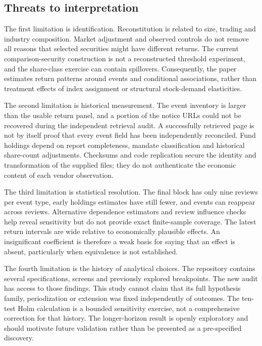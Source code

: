 \subsection{Threats to interpretation}

The first limitation is identification. Reconstitution is related to size, trading and industry composition. Market adjustment and observed controls do not remove all reasons that selected securities might have different returns. The current comparison-security construction is not a reconstructed threshold experiment, and the share-class exercise can contain spillovers. Consequently, the paper estimates return patterns around events and conditional associations, rather than treatment effects of index assignment or structural stock-demand elasticities.

The second limitation is historical measurement. The event inventory is larger than the usable return panel, and a portion of the notice URLs could not be recovered during the independent retrieval audit. A successfully retrieved page is not by itself proof that every event field has been independently reconciled. Fund holdings depend on report completeness, mandate classification and historical share-count adjustments. Checksums and code replication secure the identity and transformation of the supplied files; they do not authenticate the economic content of each vendor observation.

The third limitation is statistical resolution. The final block has only nine reviews per event type, early holdings estimates have still fewer, and events can reappear across reviews. Alternative dependence estimators and review influence checks help reveal sensitivity but do not provide exact finite-sample coverage. The latest return intervals are wide relative to economically plausible effects. An insignificant coefficient is therefore a weak basis for saying that an effect is absent, particularly when equivalence is not established.

The fourth limitation is the history of analytical choices. The repository contains several specifications, screens and previously explored breakpoints. The new audit has access to those findings. This study cannot claim that its full hypothesis family, periodization or extension was fixed independently of outcomes. The ten-test Holm calculation is a bounded sensitivity exercise, not a comprehensive correction for that history. The longer-horizon result is openly exploratory and should motivate future validation rather than be presented as a pre-specified discovery.

